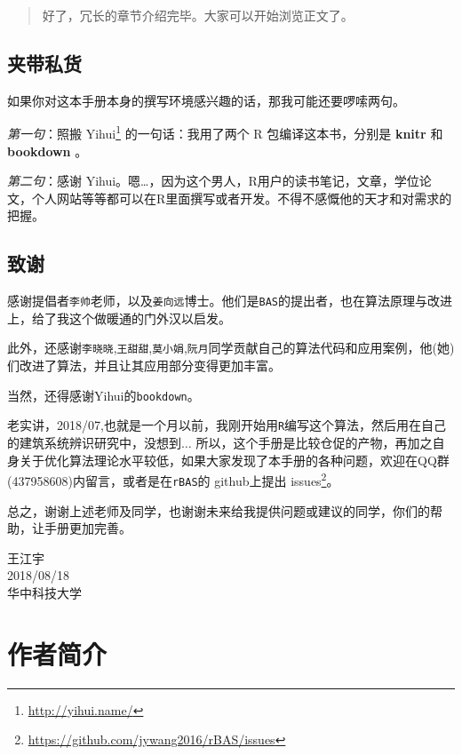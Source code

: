 \documentclass[]{ctexbook}
\renewcommand{\href}[2]{#2\footnote{\url{#1}}}
\theoremstyle{definition}
\theoremstyle{definition}
\theoremstyle{definition}
\theoremstyle{remark}
\let\BeginKnitrBlock\begin \let\EndKnitrBlock\end
\begin{document}
\begin{quote}
好了，冗长的章节介绍完毕。大家可以开始浏览正文了。
\end{quote}

\section*{夹带私货}


如果你对这本手册本身的撰写环境感兴趣的话，那我可能还要啰嗦两句。

\emph{第一句}：照搬 \href{http://yihui.name/}{Yihui}
的一句话：我用了两个 R 包编译这本书，分别是 \textbf{knitr}
\citep{xie2015} 和 \textbf{bookdown}
\citep{R-bookdown}。

\emph{第二句}：感谢
Yihui。嗯\ldots{}，因为这个男人，R用户的读书笔记，文章，学位论文，个人网站等等都可以在R里面撰写或者开发。不得不感慨他的天才和对需求的把握。

\section*{致谢}


感谢提倡者\texttt{李帅}老师，以及\texttt{姜向远}博士。他们是\texttt{BAS}的提出者，也在算法原理与改进上，给了我这个做暖通的门外汉以启发。

此外，还感谢\texttt{李晓晓},\texttt{王甜甜},\texttt{莫小娟},\texttt{阮月}同学贡献自己的算法代码和应用案例，他(她)们改进了算法，并且让其应用部分变得更加丰富。

当然，还得感谢Yihui的\texttt{bookdown}。

老实讲，2018/07,也就是一个月以前，我刚开始用\texttt{R}编写这个算法，然后用在自己的建筑系统辨识研究中，没想到\(\dots\)
所以，这个手册是比较仓促的产物，再加之自身关于优化算法理论水平较低，如果大家发现了本手册的各种问题，欢迎在QQ群(437958608)内留言，或者是在\texttt{rBAS}的
github上提出 \href{https://github.com/jywang2016/rBAS/issues}{issues}。

总之，谢谢上述老师及同学，也谢谢未来给我提供问题或建议的同学，你们的帮助，让手册更加完善。

\BeginKnitrBlock{flushright}
王江宇\\
2018/08/18\\
华中科技大学
\EndKnitrBlock{flushright}

\chapter*{作者简介}\label{author}
\end{document}
